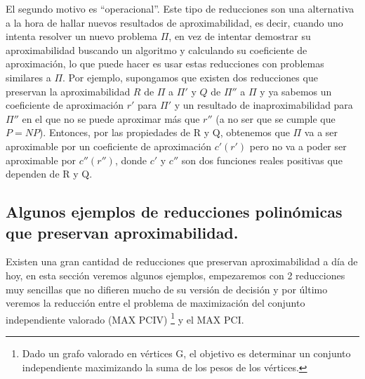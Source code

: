 \documentclass[a4paper,12pt,titlepage]{article}
\begin{document}
El segundo motivo es ``operacional''. Este tipo de reducciones son una alternativa a la hora de hallar nuevos resultados de aproximabilidad, es decir, cuando uno intenta resolver un nuevo problema $\Pi$, en vez de intentar demostrar su aproximabilidad buscando un algoritmo y calculando su coeficiente de aproximaci\'on, lo que puede hacer es usar estas reducciones con problemas similares a $\Pi$. Por ejemplo, supongamos que existen dos reducciones que preservan la aproximabilidad $R$ de $\Pi$ a $\Pi'$ y $Q$ de $\Pi''$ a $\Pi$ y ya sabemos un coeficiente de aproximaci\'on $r'$ para $\Pi'$ y un resultado de inaproximabilidad para $\Pi''$ en el que no se puede aproximar m\'as que $r''$ (a no ser que se cumple que $P=NP$). Entonces, por las propiedades de R y Q, obtenemos que $\Pi$ va a ser aproximable por un coeficiente de aproximaci\'on $c'(r')$ pero no va a poder ser aproximable por $c''(r'')$, donde $c'$ y $c''$ son dos funciones reales positivas que dependen de R y Q.

\subsection{Algunos ejemplos de reducciones polin\'omicas que preservan aproximabilidad.}

Existen una gran cantidad de reducciones que preservan aproximabilidad a d\'ia de hoy, en esta secci\'on veremos algunos ejemplos, empezaremos con 2 reducciones muy sencillas que no difieren mucho de su versi\'on de decisi\'on y por \'ultimo veremos la reducci\'on entre el problema de maximizaci\'on del conjunto independiente valorado (MAX PCIV) \footnote{Dado un grafo valorado en v\'ertices G, el objetivo es determinar un conjunto independiente maximizando la suma de los pesos de los v\'ertices.} y el MAX PCI.
\end{document}

